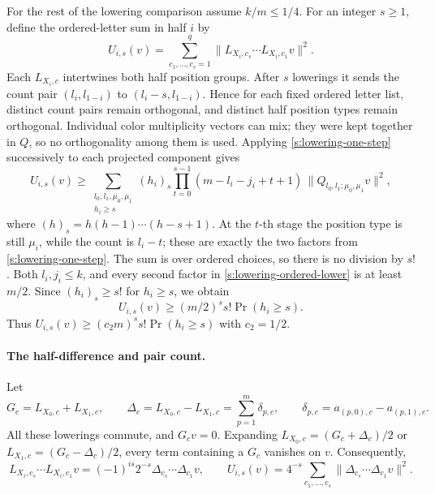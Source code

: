For the rest of the lowering comparison assume \(k/m\le1/4\).
For an integer \(s\ge1\), define the ordered-letter sum in half \(i\) by
\[
 U_{i,s}(v)=
 \sum_{c_1,\ldots,c_s=1}^q
 \|L_{X_i,c_s}\cdots L_{X_i,c_1}v\|^2.
\]
Each \(L_{X_i,c}\) intertwines both half position groups.  After \(s\)
lowerings it sends the count pair \((l_i,l_{1-i})\) to
\((l_i-s,l_{1-i})\).  Hence for each fixed ordered letter list,
distinct count pairs remain orthogonal, and distinct half position
types remain orthogonal.  Individual color multiplicity vectors can
mix; they were kept together in \(Q\), so no orthogonality among them
is used.  Applying \eqref{s:lowering-one-step} successively to each
projected component gives
\begin{equation}\label{s:lowering-ordered-lower}
 U_{i,s}(v)\ge
 \sum_{\substack{l_0,l_1,\mu_0,\mu_1\\h_i\ge s}}
 (h_i)_s
 \prod_{t=0}^{s-1}(m-l_i-j_i+t+1)\,
 \|Q_{l_0,l_1;\mu_0,\mu_1}v\|^2 ,
\end{equation}
where \((h)_s=h(h-1)\cdots(h-s+1)\).  At the \(t\)-th stage the
position type is still \(\mu_i\), while the count is \(l_i-t\);
these are exactly the two factors from
\eqref{s:lowering-one-step}.  The sum is over ordered choices, so
there is no division by \(s!\).
Both \(l_i,j_i\le k\), and every second factor
in \eqref{s:lowering-ordered-lower} is at least \(m/2\).
Since \((h_i)_s\ge s!\) for \(h_i\ge s\), we obtain
\begin{equation}\label{s:lowering-event-lower}
 U_{i,s}(v)\ge(m/2)^s s!\Pr(h_i\ge s).
\end{equation}
Thus \(U_{i,s}(v)\ge(c_2m)^s s!\Pr(h_i\ge s)\) with \(c_2=1/2\).

\paragraph{The half-difference and pair count.}
Let
\[
 G_c=L_{X_0,c}+L_{X_1,c},\qquad
 \Delta_c=L_{X_0,c}-L_{X_1,c}
          =\sum_{p=1}^m\delta_{p,c},\qquad
 \delta_{p,c}=a_{(p,0),c}-a_{(p,1),c}.
\]
All these lowerings commute, and \(G_cv=0\).  Expanding
\(L_{X_0,c}=(G_c+\Delta_c)/2\) or
\(L_{X_1,c}=(G_c-\Delta_c)/2\), every term containing a \(G_c\)
vanishes on \(v\).  Consequently,
\begin{equation}\label{s:lowering-half-scale}
 L_{X_i,c_s}\cdots L_{X_i,c_1}v
  =(-1)^{is}2^{-s}\Delta_{c_s}\cdots\Delta_{c_1}v,
 \qquad
 U_{i,s}(v)=4^{-s}\sum_{c_1,\ldots,c_s}
             \|\Delta_{c_s}\cdots\Delta_{c_1}v\|^2 .
\end{equation}

